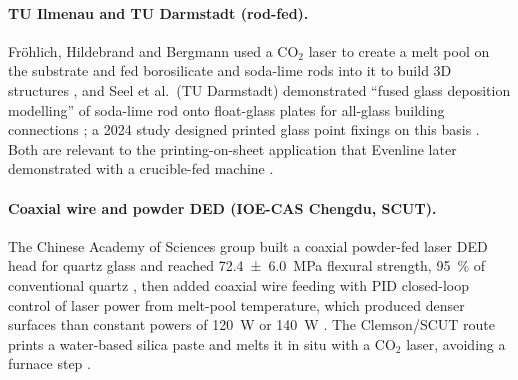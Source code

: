 \paragraph{TU Ilmenau and TU Darmstadt (rod-fed).} Fr{\"o}hlich, Hildebrand and Bergmann used a CO$_2$ laser to create a melt pool on the substrate and fed borosilicate and soda-lime rods into it to build 3D structures \citep{froehlich2022}, and Seel et al.\ (TU Darmstadt) demonstrated ``fused glass deposition modelling'' of soda-lime rod onto float-glass plates for all-glass building connections \citep{seel2018}; a 2024 study designed printed glass point fixings on this basis \citep{pointfixings2024}. Both are relevant to the printing-on-sheet application that Evenline later demonstrated with a crucible-fed machine \citep{stern2024cgc}.

\paragraph{Coaxial wire and powder DED (IOE-CAS Chengdu, SCUT).} The Chinese Academy of Sciences group built a coaxial powder-fed laser DED head for quartz glass and reached \SI{72.4 +- 6.0}{MPa} flexural strength, \SI{95}{\percent} of conventional quartz \citep{lang2024}, then added coaxial wire feeding with PID closed-loop control of laser power from melt-pool temperature, which produced denser surfaces than constant powers of \SI{120}{W} or \SI{140}{W} \citep{lgd2025tempctrl}. The Clemson/SCUT route prints a water-based silica paste and melts it in situ with a CO$_2$ laser, avoiding a furnace step \citep{ieee2019dlm,paste2024}.

